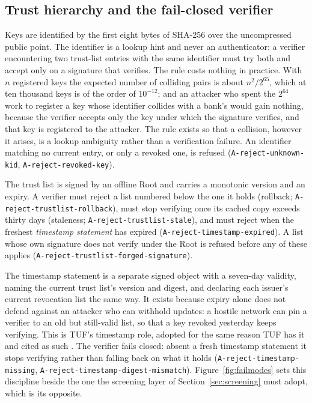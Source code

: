 \documentclass[10pt,a4paper,twocolumn]{article}
\newcommand{\code}[1]{\texttt{\small #1}}
\begin{document}
\subsection{Trust hierarchy and the fail-closed verifier}

Keys are identified by the first eight bytes of SHA-256 over the uncompressed
public point. The identifier is a lookup hint and never an authenticator: a
verifier encountering two trust-list entries with the same identifier must try
both and accept only on a signature that verifies. The rule costs nothing in
practice. With $n$ registered keys the expected number of colliding pairs is
about $n^2/2^{65}$, which at ten thousand keys is of the order of $10^{-12}$;
and an attacker who spent the $2^{64}$ work to register a key whose identifier
collides with a bank's would gain nothing, because the verifier accepts only
the key under which the signature verifies, and that key is registered to the
attacker. The rule exists so that a collision, however it arises, is a lookup
ambiguity rather than a verification failure. An identifier matching no
current entry, or only a revoked one, is refused
(\code{A-reject-\allowbreak unknown-\allowbreak kid},
\code{A-reject-\allowbreak revoked-\allowbreak key}).

The trust list is signed by an offline Root and carries a monotonic version and
an expiry. A verifier must reject a list numbered below the one it holds
(rollback; \code{A-reject-\allowbreak trustlist-\allowbreak rollback}), must stop
verifying once its cached copy exceeds thirty days (staleness;
\code{A-reject-\allowbreak trustlist-\allowbreak stale}), and must reject when
the freshest \emph{timestamp statement} has expired
(\code{A-reject-\allowbreak timestamp-\allowbreak expired}). A list whose own
signature does not verify under the Root is refused before any of these applies
(\code{A-reject-\allowbreak trustlist-\allowbreak forged-\allowbreak signature}).

The timestamp statement is a separate signed object with a seven-day validity,
naming the current trust list's version and digest, and declaring each
issuer's current revocation list the same way. It exists because expiry
alone does not defend against an attacker who can withhold updates: a hostile
network can pin a verifier to an old but still-valid list, so that a key revoked
yesterday keeps verifying. This is TUF's timestamp role, adopted for the same
reason TUF has it and cited as such \citep{tufspec}. The verifier fails closed:
absent a fresh timestamp statement it stops verifying rather than falling back
on what it holds (\code{A-reject-\allowbreak timestamp-\allowbreak missing},
\code{A-reject-\allowbreak timestamp-\allowbreak digest-\allowbreak mismatch}).
Figure~\ref{fig:failmodes} sets this discipline beside the one the screening
layer of Section~\ref{sec:screening} must adopt, which is its opposite.
\end{document}
